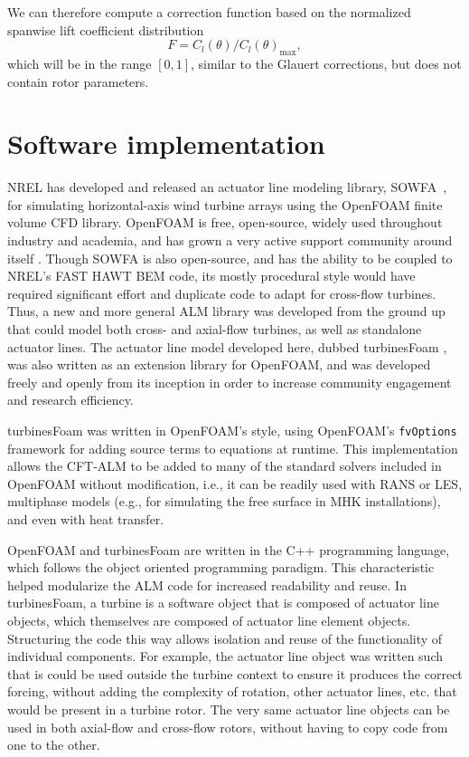 \documentclass[times]{weauth}
\begin{document}
We can therefore compute a correction function based on the normalized spanwise
lift coefficient distribution
\begin{equation}
    F = C_l(\theta)/C_l(\theta)_{\max},
\end{equation}
which will be in the range $[0, 1]$, similar to the Glauert corrections, but
does not contain rotor parameters.


\section{Software implementation}

NREL has developed and released an actuator line modeling library,
SOWFA~\cite{Churchfield2014b}, for simulating horizontal-axis wind turbine
arrays using the OpenFOAM finite volume CFD library. OpenFOAM is free,
open-source, widely used throughout industry and academia, and has grown a very
active support community around itself \cite{Bachant2015-CFD-online}. Though
SOWFA is also open-source, and has the ability to be coupled to NREL's FAST HAWT
BEM code, its mostly procedural style would have required significant effort and
duplicate code to adapt for cross-flow turbines. Thus, a new and more general
ALM library was developed from the ground up that could model both cross- and
axial-flow turbines, as well as standalone actuator lines. The actuator line
model developed here, dubbed turbinesFoam
\cite{Bachant2016-turbinesFoam-v0.0.7}, was also written as an extension library
for OpenFOAM, and was developed freely and openly from its inception in order to
increase community engagement and research efficiency.

turbinesFoam was written in OpenFOAM's style, using OpenFOAM's
\texttt{fvOptions} framework for adding source terms to equations at runtime.
This implementation allows the CFT-ALM to be added to many of the standard
solvers included in OpenFOAM without modification, i.e., it can be readily used
with RANS or LES, multiphase models (e.g., for simulating the free surface in
MHK installations), and even with heat transfer.

OpenFOAM and turbinesFoam are written in the C++ programming language, which
follows the object oriented programming paradigm. This characteristic helped
modularize the ALM code for increased readability and reuse. In turbinesFoam, a
turbine is a software object that is composed of actuator line objects, which
themselves are composed of actuator line element objects. Structuring the code
this way allows isolation and reuse of the functionality of individual
components. For example, the actuator line object was written such that is could
be used outside the turbine context to ensure it produces the correct forcing,
without adding the complexity of rotation, other actuator lines, etc. that would
be present in a turbine rotor. The very same actuator line objects can be used
in both axial-flow and cross-flow rotors, without having to copy code from one
to the other.
\end{document}
